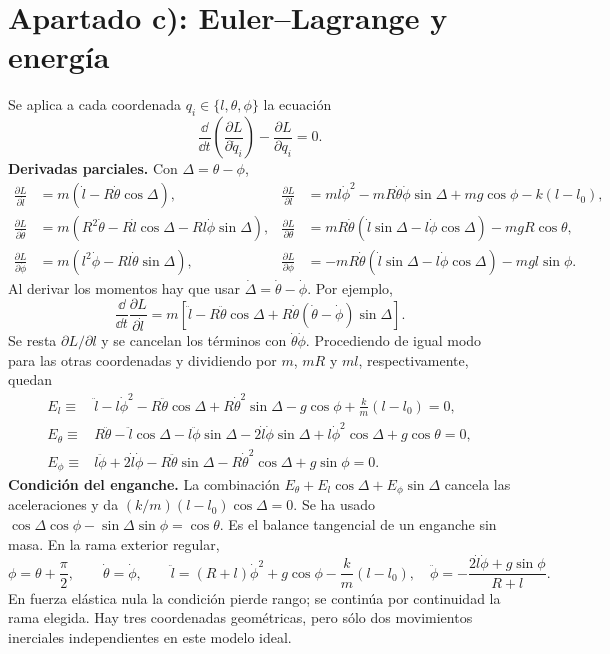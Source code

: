 \documentclass[11pt,a4paper]{article}
\begin{document}
\section{Apartado c): Euler--Lagrange y energía}
Se aplica a cada coordenada $q_i\in\{l,\theta,\phi\}$ la ecuación
\begin{equation}
 \frac{\dd}{\dd t}\left(\frac{\partial L}{\partial\dot q_i}\right)
 -\frac{\partial L}{\partial q_i}=0.
\end{equation}
\textbf{Derivadas parciales.} Con $\Delta=\theta-\phi$,
\begin{align}
 \frac{\partial L}{\partial\dot l}&=m(\dot l-R\dot\theta\cos\Delta), &
 \frac{\partial L}{\partial l}&=ml\dot\phi^2-mR\dot\theta\dot\phi\sin\Delta+mg\cos\phi-k(l-l_0),\\
 \frac{\partial L}{\partial\dot\theta}&=m(R^2\dot\theta-R\dot l\cos\Delta-Rl\dot\phi\sin\Delta), &
 \frac{\partial L}{\partial\theta}&=mR\dot\theta(\dot l\sin\Delta-l\dot\phi\cos\Delta)-mgR\cos\theta,\\
 \frac{\partial L}{\partial\dot\phi}&=m(l^2\dot\phi-Rl\dot\theta\sin\Delta), &
 \frac{\partial L}{\partial\phi}&=-mR\dot\theta(\dot l\sin\Delta-l\dot\phi\cos\Delta)-mgl\sin\phi.
\end{align}
Al derivar los momentos hay que usar $\dot\Delta=\dot\theta-\dot\phi$. Por ejemplo,
\begin{equation}
 \frac{\dd}{\dd t}\frac{\partial L}{\partial\dot l}
 =m[\ddot l-R\ddot\theta\cos\Delta+R\dot\theta(\dot\theta-\dot\phi)\sin\Delta].
\end{equation}
Se resta $\partial L/\partial l$ y se cancelan los términos con $\dot\theta\dot\phi$. Procediendo de igual modo para las otras coordenadas y dividiendo por $m$, $mR$ y $ml$, respectivamente, quedan
\begin{align}
 E_l\equiv{}&\ddot l-l\dot\phi^2-R\ddot\theta\cos\Delta+R\dot\theta^2\sin\Delta
 -g\cos\phi+\tfrac km(l-l_0)=0,\\
 E_\theta\equiv{}&R\ddot\theta-\ddot l\cos\Delta-l\ddot\phi\sin\Delta
 -2\dot l\dot\phi\sin\Delta+l\dot\phi^2\cos\Delta+g\cos\theta=0,\\
 E_\phi\equiv{}&l\ddot\phi+2\dot l\dot\phi-R\ddot\theta\sin\Delta
 -R\dot\theta^2\cos\Delta+g\sin\phi=0.
\end{align}
\textbf{Condición del enganche.} La combinación $E_\theta+E_l\cos\Delta+E_\phi\sin\Delta$ cancela las aceleraciones y da $(k/m)(l-l_0)\cos\Delta=0$. Se ha usado $\cos\Delta\cos\phi-\sin\Delta\sin\phi=\cos\theta$. Es el balance tangencial de un enganche sin masa. En la rama exterior regular,
\begin{equation}
 \phi=\theta+\frac\pi2,\qquad \dot\theta=\dot\phi,\qquad
 \ddot l=(R+l)\dot\phi^2+g\cos\phi-\frac km(l-l_0),\quad
 \ddot\phi=-\frac{2\dot l\dot\phi+g\sin\phi}{R+l}.
\end{equation}
En fuerza elástica nula la condición pierde rango; se continúa por continuidad la rama elegida. Hay tres coordenadas geométricas, pero sólo dos movimientos inerciales independientes en este modelo ideal.
\end{document}
